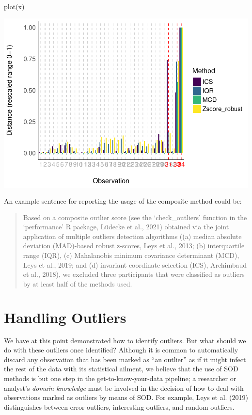 \documentclass[
]{article}
\newenvironment{Shaded}{\begin{snugshade}}{\end{snugshade}}
\newcommand{\FunctionTok}[1]{\textcolor[rgb]{0.00,0.00,0.00}{#1}}
\newcommand{\NormalTok}[1]{#1}
\begin{document}
\begin{Shaded}
\begin{Highlighting}[]
\FunctionTok{plot}\NormalTok{(x)}
\end{Highlighting}
\end{Shaded}

\includegraphics[width=1\linewidth]{paper_files/figure-latex/multimethod-1}

An example sentence for reporting the usage of the composite method
could be:

\begin{quote}
Based on a composite outlier score (see the `check\_outliers' function
in the `performance' R package, Lüdecke et al., 2021) obtained via the
joint application of multiple outliers detection algorithms ((a) median
absolute deviation (MAD)-based robust z-scores, Leys et al., 2013; (b)
interquartile range (IQR), (c) Mahalanobis minimum covariance
determinant (MCD), Leys et al., 2019; and (d) invariant coordinate
selection (ICS), Archimbaud et al., 2018), we excluded three
participants that were classified as outliers by at least half of the
methods used.
\end{quote}

\hypertarget{handling-outliers}{%
\section{Handling Outliers}\label{handling-outliers}}

We have at this point demonstrated how to identify outliers. But what
should we do with these outliers once identified? Although it is common
to automatically discard any observation that has been marked as ``an
outlier'' as if it might infect the rest of the data with its
statistical ailment, we believe that the use of SOD methods is but one
step in the get-to-know-your-data pipeline; a researcher or analyst's
\emph{domain knowledge} must be involved in the decision of how to deal
with observations marked as outliers by means of SOD. For example, Leys
et al. (2019) distinguishes between error outliers, interesting
outliers, and random outliers.
\end{document}
